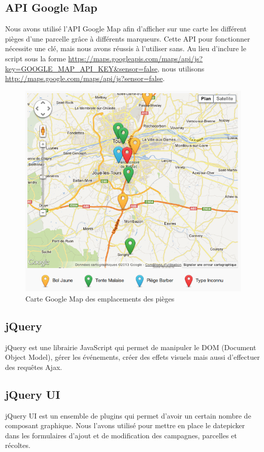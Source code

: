 \documentclass[twoside]{EPURapport}
\begin{document}
		\subsection{API Google Map}
		\label{lib:map}
		Nous avons utilisé l'API Google Map afin d'afficher sur une carte les différent pièges d'une parcelle grâce à différents marqueurs. Cette API pour fonctionner nécessite une clé, mais nous avons réussis à l'utiliser sans. Au lieu d'inclure le script sous la forme \url{https://maps.googleapis.com/maps/api/js?key=GOOGLE_MAP_API_KEY&sensor=false}, nous utilisons \url{http://maps.google.com/maps/api/js?sensor=false}.
		
		\begin{figure}[hbtp]
			\centering
			\includegraphics[scale=0.5]{images/lib-API_GoogleMap.png}
			\caption{Carte Google Map des emplacements des pièges}
		\end{figure}
		
		\subsection{jQuery}
		\label{lib:jquery}
		jQuery est une librairie JavaScript qui permet de manipuler le DOM (Document Object Model), gérer les événements, créer des effets visuels mais aussi d'effectuer des requêtes Ajax.
		
		\subsection{jQuery UI}
		\label{lib:jqueryui}
		jQuery UI est un ensemble de plugins qui permet d'avoir un certain nombre de composant graphique. Nous l'avons utilisé pour mettre en place le datepicker dans les formulaires d'ajout et de modification des campagnes, parcelles et récoltes.
		
\end{document}
